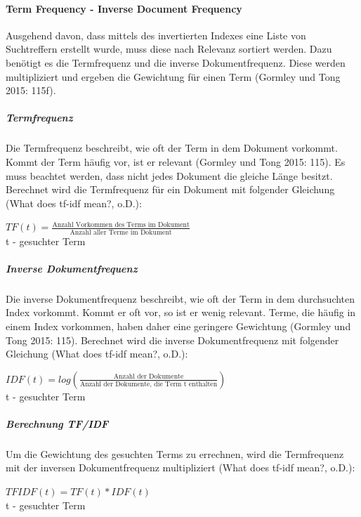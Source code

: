 \documentclass[a4paper]{scrartcl}
\begin{document}
\paragraph{Term Frequency - Inverse Document Frequency}
Ausgehend davon, dass mittels des invertierten Indexes eine Liste von Suchtreffern erstellt wurde, muss diese nach Relevanz sortiert werden. Dazu benötigt es die Termfrequenz und die inverse Dokumentfrequenz. Diese werden multipliziert und ergeben die Gewichtung für einen Term (Gormley und Tong 2015: 115f). 

\subparagraph{Termfrequenz}
Die Termfrequenz beschreibt, wie oft der Term in dem Dokument vorkommt. Kommt der Term häufig vor, ist er relevant (Gormley und Tong 2015: 115). Es muss beachtet werden, dass nicht jedes Dokument die gleiche Länge besitzt. Berechnet wird die Termfrequenz für ein Dokument mit folgender Gleichung (What does tf-idf mean?, o.D.):

\begin{center}
	
	$ TF(t) = \frac{\text{Anzahl Vorkommen des Terms im Dokument}}{\text{Anzahl aller Terme im Dokument}} $ \\
	t - gesuchter Term 	
	
\end{center}

\subparagraph{Inverse Dokumentfrequenz}
Die inverse Dokumentfrequenz beschreibt, wie oft der Term in dem durchsuchten Index vorkommt. Kommt er oft vor, so ist er wenig relevant. Terme, die häufig in einem Index vorkommen, haben daher eine geringere Gewichtung (Gormley und Tong 2015: 115). Berechnet wird die inverse Dokumentfrequenz mit folgender Gleichung (What does tf-idf mean?, o.D.):

\begin{center}
	
	$ IDF(t) = log( \frac{\text{Anzahl der Dokumente}}{\text{Anzahl der Dokumente, die Term t enthalten}} ) $ \\
	t - gesuchter Term 	
	
\end{center}


\subparagraph{Berechnung TF/IDF}
Um die Gewichtung des gesuchten Terms zu errechnen, wird die Termfrequenz mit der inversen Dokumentfrequenz multipliziert (What does tf-idf mean?, o.D.):

\begin{center}
	
	$ TFIDF(t) = TF(t) * IDF(t) $ \\
	t - gesuchter Term 	
	
\end{center}
\end{document}
